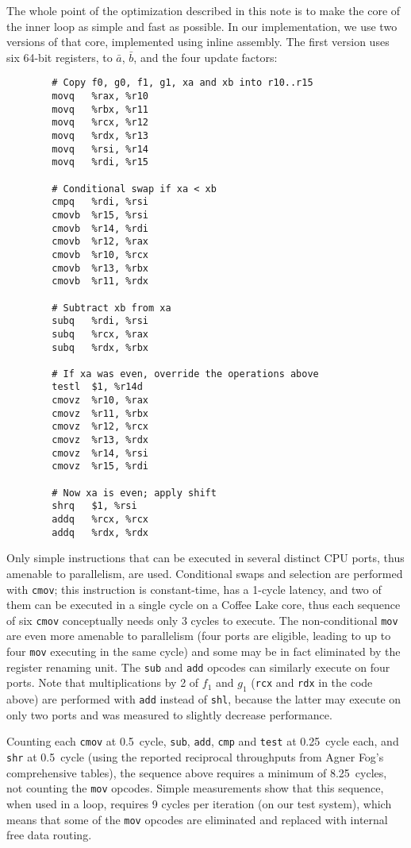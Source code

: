 \documentclass{llncs}
\begin{document}
The whole point of the optimization described in this note is to make
the core of the inner loop as simple and fast as possible. In our
implementation, we use two versions of that core, implemented using
inline assembly. The first version uses six 64-bit registers, to
$\bar a$, $\bar b$, and the four update factors:
\begin{verbatim}
        # Copy f0, g0, f1, g1, xa and xb into r10..r15
        movq   %rax, %r10
        movq   %rbx, %r11
        movq   %rcx, %r12
        movq   %rdx, %r13
        movq   %rsi, %r14
        movq   %rdi, %r15

        # Conditional swap if xa < xb
        cmpq   %rdi, %rsi
        cmovb  %r15, %rsi
        cmovb  %r14, %rdi
        cmovb  %r12, %rax
        cmovb  %r10, %rcx
        cmovb  %r13, %rbx
        cmovb  %r11, %rdx

        # Subtract xb from xa
        subq   %rdi, %rsi
        subq   %rcx, %rax
        subq   %rdx, %rbx

        # If xa was even, override the operations above
        testl  $1, %r14d
        cmovz  %r10, %rax
        cmovz  %r11, %rbx
        cmovz  %r12, %rcx
        cmovz  %r13, %rdx
        cmovz  %r14, %rsi
        cmovz  %r15, %rdi

        # Now xa is even; apply shift
        shrq   $1, %rsi
        addq   %rcx, %rcx
        addq   %rdx, %rdx
\end{verbatim}
Only simple instructions that can be executed in several distinct CPU
ports, thus amenable to parallelism, are used. Conditional swaps and
selection are performed with \verb+cmov+; this instruction is
constant-time, has a 1-cycle latency, and two of them can be executed in
a single cycle on a Coffee Lake core, thus each sequence of six
\verb+cmov+ conceptually needs only 3 cycles to execute. The
non-conditional \verb+mov+ are even more amenable to parallelism (four
ports are eligible, leading to up to four \verb+mov+ executing in the
same cycle) and some may be in fact eliminated by the register renaming
unit. The \verb+sub+ and \verb+add+ opcodes can similarly execute on
four ports. Note that multiplications by 2 of $f_1$ and $g_1$
(\verb+rcx+ and \verb+rdx+ in the code above) are performed with
\verb+add+ instead of \verb+shl+, because the latter may execute on only
two ports and was measured to slightly decrease performance.

Counting each \verb+cmov+ at 0.5~cycle, \verb+sub+, \verb+add+,
\verb+cmp+ and \verb+test+ at 0.25~cycle each, and \verb+shr+ at
0.5~cycle (using the reported reciprocal throughputs from Agner Fog's
comprehensive tables\cite{FogTables}), the sequence above requires a
minimum of 8.25~cycles, not counting the \verb+mov+ opcodes. Simple
measurements show that this sequence, when used in a loop, requires 9
cycles per iteration (on our test system), which means that some of the
\verb+mov+ opcodes are eliminated and replaced with internal free data
routing.
\end{document}
